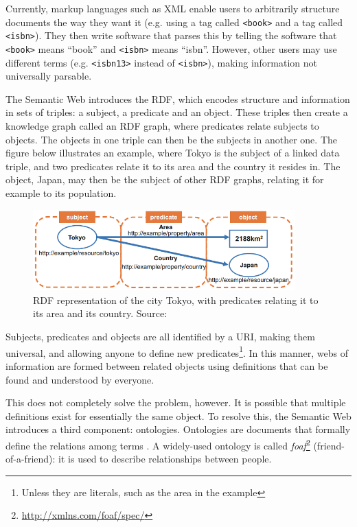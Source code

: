 Currently, markup languages such as XML enable users to arbitrarily structure documents the way they want it (e.g. using a tag called \texttt{<book>} and a tag called \texttt{<isbn>}). They then write software that parses this by telling the software that \texttt{<book>} means ``book'' and \texttt{<isbn>} means ``isbn''. However, other users may use different terms (e.g. \texttt{<isbn13>} instead of \texttt{<isbn>}), making information not universally parsable. 

\noindent The Semantic Web introduces the \gls{RDF}, which encodes structure and information in sets of triples: a subject, a predicate and an object. These triples then create a knowledge graph called an RDF graph, where predicates relate subjects to objects. The objects in one triple can then be the subjects in another one. The figure below illustrates an example, where Tokyo is the subject of a linked data triple, and two predicates relate it to its area and the country it resides in. The object, Japan, may then be the subject of other RDF graphs, relating it for example to its population.

\begin{figure}[H]
    \centering
    \includegraphics[width = 0.9\textwidth]{images/background/linked-data.png}
    \caption{\gls{RDF} representation of the city Tokyo, with predicates relating it to its area and its country. Source: \citet{generating-pva}}
    \label{fig:linked-data}
\end{figure}

\noindent Subjects, predicates and objects are all identified by a URI, making them universal, and allowing anyone to define new predicates\footnote{Unless they are literals, such as the area in the example}. In this manner, webs of information are formed between related objects using definitions that can be found and understood by everyone.

This does not completely solve the problem, however. It is possible that multiple definitions exist for essentially the same object. To resolve this, the Semantic Web introduces a third component: ontologies. Ontologies are documents that formally define the relations among terms \citep{semantic-web}. A widely-used ontology is called \textit{foaf}\footnote{\url{ http://xmlns.com/foaf/spec/}} (friend-of-a-friend): it is used to describe relationships between people.

